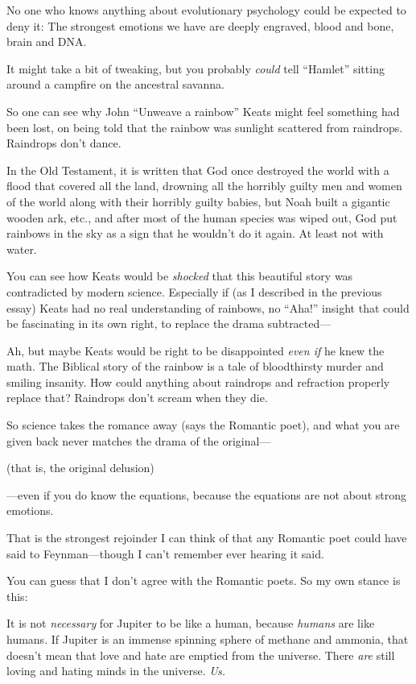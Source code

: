 {
 No one who knows anything about evolutionary psychology could be
expected to deny it: The strongest emotions we have are deeply
engraved, blood and bone, brain and DNA.}

{
 It might take a bit of tweaking, but you probably \textit{could}
tell ``Hamlet'' sitting around a
campfire on the ancestral savanna.}

{
 So one can see why John ``Unweave a
rainbow'' Keats might feel something had been lost,
on being told that the rainbow was sunlight scattered from raindrops.
Raindrops don't dance.}

{
 In the Old Testament, it is written that God once destroyed the
world with a flood that covered all the land, drowning all the horribly
guilty men and women of the world along with their horribly guilty
babies, but Noah built a gigantic wooden ark, etc., and after most of
the human species was wiped out, God put rainbows in the sky as a sign
that he wouldn't do it again. At least not with water.}

{
 You can see how Keats would be \textit{shocked} that this
beautiful story was contradicted by modern science. Especially if (as I
described in the previous essay) Keats had no real understanding of
rainbows, no ``Aha!'' insight that
could be fascinating in its own right, to replace the drama
subtracted---}

{
 Ah, but maybe Keats would be right to be disappointed \textit{even
if} he knew the math. The Biblical story of the rainbow is a tale of
bloodthirsty murder and smiling insanity. How could anything about
raindrops and refraction properly replace that? Raindrops
don't scream when they die.}

{
 So science takes the romance away (says the Romantic poet), and
what you are given back never matches the drama of the original---}

{
 (that is, the original delusion)}

{
 {}---even if you do know the equations, because the equations are
not about strong emotions.}

{
 That is the strongest rejoinder I can think of that any Romantic
poet could have said to Feynman---though I can't
remember ever hearing it said.}

{
 You can guess that I don't agree with the Romantic
poets. So my own stance is this:}

{
 It is not \textit{necessary} for Jupiter to be like a human,
because \textit{humans} are like humans. If Jupiter is an immense
spinning sphere of methane and ammonia, that doesn't
mean that love and hate are emptied from the universe. There
\textit{are} still loving and hating minds in the universe.
\textit{Us.}}

